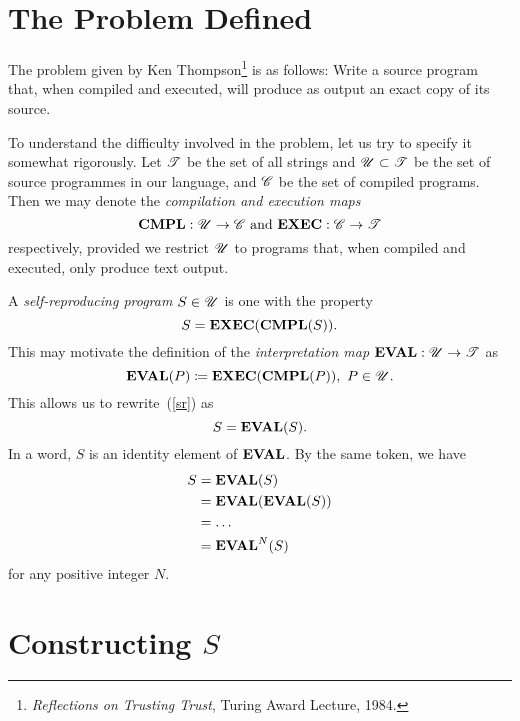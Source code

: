 \section{The Problem Defined}
The problem given by Ken Thompson\footnote{{\sl Reflections on Trusting Trust}, Turing Award
Lecture, 1984.} is as follows: 
Write a source program that, when compiled and executed, will produce as output an exact copy of its
source.

To understand the difficulty involved in the problem, let us try to specify it somewhat rigorously.
Let $\mathscr{T}$ be the set of all strings and $\mathscr{U}\subset\mathscr{T}$ be the set of source programmes in our
language, and $\mathscr{C}$ be the set of compiled programs.
Then we may denote the {\sl compilation {\rm and} execution maps\/}
\[ \text{\bf CMPL}: \mathscr{U} \to \mathscr{C} \text{~and~} \text{\bf EXEC}: \mathscr{C} \to \mathscr{T} \]
respectively, provided we restrict $\mathscr{U}$ to programs that, when compiled and executed, only produce
text output.

A {\sl self-reproducing program\/} $S\in\mathscr{U}$ is one with the property
\begin{equation}\label{sr}
    S = \text{\bf EXEC}(\text{\bf CMPL}(S)).
\end{equation}
This may motivate the definition of the {\sl interpretation map\/} $\text{\bf EVAL}:\mathscr{U}\to\mathscr{T}$ as
\[  \text{\bf EVAL}(P) \coloneqq \text{\bf EXEC}(\text{\bf CMPL}(P)),~P\in\mathscr{U}. \]
This allows us to rewrite~(\ref{sr}) as
\[ S = \text{\bf EVAL}(S). \]
In a word, $S$ is an identity element of $\text{\bf EVAL}$.
By the same token, we have
\begin{align*}
    S &= \text{\bf EVAL}(S) \\
      &= \text{\bf EVAL}(\text{\bf EVAL}(S)) \\
      &= \ldots{} \\
      &= \text{\bf EVAL}^N(S)
\end{align*}
for any positive integer $N$.

\section{Constructing $S$}

